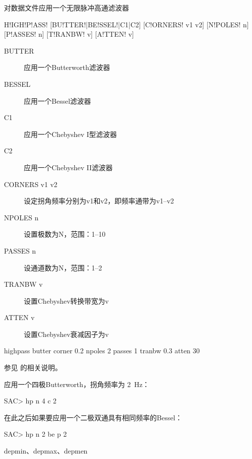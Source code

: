 \label{cmd:highpass}

对数据文件应用一个无限脉冲高通滤波器

\begin{SACSTX}
H!IGH!P!ASS! [BU!TTER!|BE!SSEL!|C1|C2] [C!ORNERS! v1 v2] [N!POLES! n] [P!ASSES! n]
    [T!RANBW! v] [A!TTEN! v]
\end{SACSTX}

\begin{description}
\item [BUTTER] 应用一个Butterworth滤波器
\item [BESSEL] 应用一个Bessel滤波器
\item [C1] 应用一个Chebyshev I型滤波器
\item [C2] 应用一个Chebyshev II滤波器
\item [CORNERS v1 v2] 设定拐角频率分别为v1和v2，即频率通带为v1--v2
\item [NPOLES n] 设置极数为N，范围：1--10
\item [PASSES n] 设通道数为N，范围：1--2
\item [TRANBW v] 设置Chebyshev转换带宽为v
\item [ATTEN v] 设置Chebyshev衰减因子为v
\end{description}

\begin{SACDFT}
highpass butter corner 0.2 npoles 2 passes 1 tranbw 0.3 atten 30
\end{SACDFT}

参见  的相关说明。

应用一个四极Butterworth，拐角频率为 \SI{2}{\Hz}：
\begin{SACCode}
SAC> hp n 4 c 2
\end{SACCode}

在此之后如果要应用一个二极双通具有相同频率的Bessel：
\begin{SACCode}
SAC> hp n 2 be p 2
\end{SACCode}

depmin、depmax、depmen
